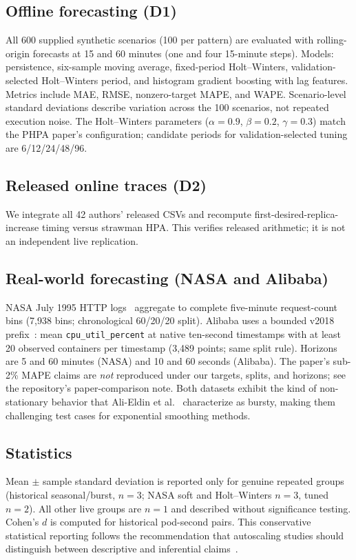 \documentclass[journal]{IEEEtran}
\begin{document}
\subsection{Offline forecasting (D1)}
All 600 supplied synthetic scenarios (100 per pattern) are evaluated with rolling-origin forecasts at 15 and 60 minutes (one and four 15-minute steps). Models: persistence, six-sample moving average, fixed-period Holt--Winters, validation-selected Holt--Winters period, and histogram gradient boosting with lag features. Metrics include MAE, RMSE, nonzero-target MAPE, and WAPE. Scenario-level standard deviations describe variation across the 100 scenarios, not repeated execution noise. The Holt--Winters parameters ($\alpha{=}0.9$, $\beta{=}0.2$, $\gamma{=}0.3$) match the PHPA paper's configuration; candidate periods for validation-selected tuning are 6/12/24/48/96.

\subsection{Released online traces (D2)}
We integrate all 42 authors' released CSVs and recompute first-desired-replica-increase timing versus strawman HPA. This verifies released arithmetic; it is not an independent live replication.

\subsection{Real-world forecasting (NASA and Alibaba)}
NASA July 1995 HTTP logs~\cite{arlitt1996} aggregate to complete five-minute request-count bins (7,938 bins; chronological 60/20/20 split). Alibaba uses a bounded v2018 prefix~\cite{jiang2020}: mean \texttt{cpu\_util\_percent} at native ten-second timestamps with at least 20 observed containers per timestamp (3,489 points; same split rule). Horizons are 5 and 60 minutes (NASA) and 10 and 60 seconds (Alibaba). The paper's sub-2\% MAPE claims are \emph{not} reproduced under our targets, splits, and horizons; see the repository's paper-comparison note. Both datasets exhibit the kind of non-stationary behavior that Ali-Eldin et al.~\cite{alieldin2014} characterize as bursty, making them challenging test cases for exponential smoothing methods.

\subsection{Statistics}
Mean $\pm$ sample standard deviation is reported only for genuine repeated groups (historical seasonal/burst, $n{=}3$; NASA soft and Holt--Winters $n{=}3$, tuned $n{=}2$). All other live groups are $n{=}1$ and described without significance testing. Cohen's $d$ is computed for historical pod-second pairs. This conservative statistical reporting follows the recommendation that autoscaling studies should distinguish between descriptive and inferential claims~\cite{mca2026}.
\end{document}
